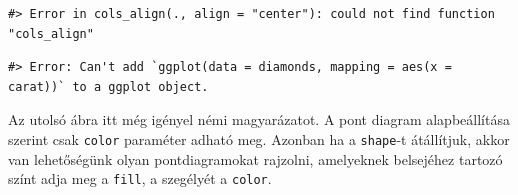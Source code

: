 \documentclass[
]{article}
\newenvironment{Shaded}{\begin{snugshade}}{\end{snugshade}}
\newcommand{\AttributeTok}[1]{\textcolor[rgb]{0.77,0.63,0.00}{#1}}
\newcommand{\DecValTok}[1]{\textcolor[rgb]{0.00,0.00,0.81}{#1}}
\newcommand{\FunctionTok}[1]{\textcolor[rgb]{0.00,0.00,0.00}{#1}}
\newcommand{\NormalTok}[1]{#1}
\newcommand{\SpecialCharTok}[1]{\textcolor[rgb]{0.00,0.00,0.00}{#1}}
\newcommand{\StringTok}[1]{\textcolor[rgb]{0.31,0.60,0.02}{#1}}
\begin{document}
\begin{verbatim}
#> Error in cols_align(., align = "center"): could not find function "cols_align"
\end{verbatim}

\begin{Shaded}
\end{Shaded}

\begin{verbatim}
#> Error: Can't add `ggplot(data = diamonds, mapping = aes(x = carat))` to a ggplot object.
\end{verbatim}

Az utolsó ábra itt még igényel némi magyarázatot. A pont diagram alapbeállítása szerint csak \texttt{color} paraméter adható meg. Azonban ha a \texttt{shape}-t átállítjuk, akkor van lehetőségünk olyan pontdiagramokat rajzolni, amelyeknek belsejéhez tartozó színt adja meg a \texttt{fill}, a szegélyét a \texttt{color}.
\end{document}
